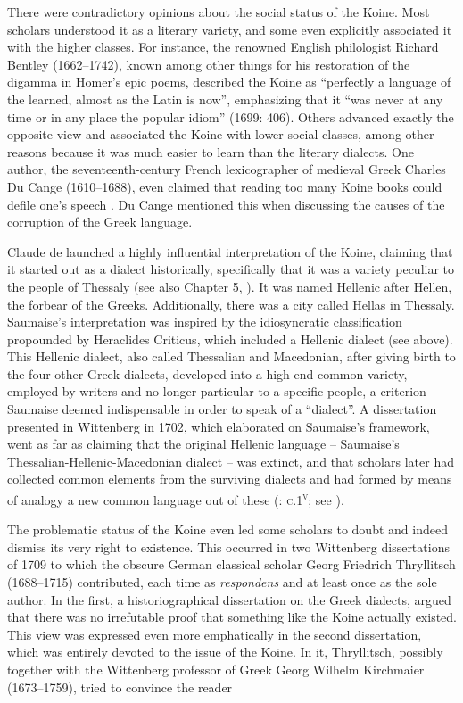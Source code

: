 {There were contradictory opinions about the social status of the Koine. Most scholars understood it as a literary variety, and some even explicitly associated it with the higher classes. For instance, the renowned English philologist Richard Bentley (1662–1742), known among other things for his restoration of the digamma in Homer’s epic poems, described the Koine as “perfectly a language of the learned, almost as the Latin is now”, emphasizing that it “was never at any time or in any place the popular idiom” (1699: 406). Others advanced exactly the opposite view and associated the Koine with lower social classes, among other reasons because it was much easier to learn than the literary dialects. One author, the seventeenth-century French lexicographer of medieval Greek Charles Du Cange (1610–1688), even claimed that reading too many Koine books could defile one’s speech \citep[iv]{Du1688}. Du Cange mentioned this when discussing the causes of the corruption of the Greek language.

Claude de \citet[esp. 405--406]{Saumaise1643a} launched a highly influential interpretation of the Koine, claiming that it started out as a dialect historically, specifically that it was a variety peculiar to the people of Thessaly (see also Chapter 5, ). It was named Hellenic after Hellen, the forbear of the Greeks. Additionally, there was a city called Hellas in Thessaly. Saumaise's interpretation was inspired by the idiosyncratic classification propounded by Heraclides Criticus, which included a Hellenic dialect (see  above). This Hellenic dialect, also called Thessalian and Macedonian, after giving birth to the four other Greek dialects, developed into a high-end common variety, employed by writers and no longer particular to a specific people, a criterion Saumaise deemed indispensable in order to speak of a “dialect”. A dissertation presented in Wittenberg in 1702, which elaborated on Saumaise’s framework, went as far as claiming that the original Hellenic language – Saumaise’s Thessalian-Hellenic-Macedonian dialect – was extinct, and that scholars later had collected common elements from the surviving dialects and had formed by means of analogy a new common language out of these (\citealt{Schwartz1702}: \textsc{c}.1\textsc{\textsuperscript{v}}; see \citet[]{VanRooyFce}).

The problematic status of the Koine even led some scholars to doubt and indeed dismiss its very right to existence. This occurred in two Wittenberg dissertations of 1709 to which the obscure German classical scholar Georg Friedrich Thryllitsch (1688–1715) contributed, each time as \textit{respondens} and at least once as the sole author. In the first, a historiographical dissertation on the Greek dialects, \citet[\textsc{d.1}\textsc{\textsuperscript{v}}]{Thryllitsch1709} argued that there was no irrefutable proof that something like the Koine actually existed. This view was expressed even more emphatically in the second dissertation, which was entirely devoted to the issue of the Koine. In it, Thryllitsch, possibly together with the Wittenberg professor of Greek Georg Wilhelm Kirchmaier (1673–1759), tried to convince the reader

}
